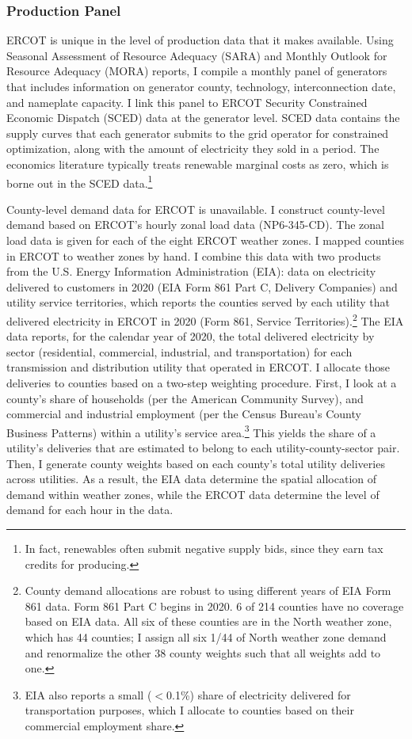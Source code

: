 \documentclass[12pt]{article}
\begin{document}
\subsubsection{Production Panel}
\label{sec:production}
ERCOT is unique in the level of production data that it makes available.  Using Seasonal Assessment of Resource Adequacy (SARA) and Monthly Outlook for Resource Adequacy (MORA) reports, I compile a monthly panel of generators that includes information on generator county, technology, interconnection date, and nameplate capacity. I link this panel to ERCOT Security Constrained Economic Dispatch (SCED) data at the generator level. SCED data contains the supply curves that each generator submits to the grid operator for constrained optimization, along with the amount of electricity they sold in a period. The economics literature typically treats renewable marginal costs as zero, which is borne out in the SCED data.\footnote{In fact, renewables often submit negative supply bids, since they earn tax credits for producing.} 



County-level demand data for ERCOT is unavailable. I construct county-level demand based on ERCOT's hourly zonal load data (NP6-345-CD). The zonal load data is given for each of the eight ERCOT weather zones. I mapped counties in ERCOT to weather zones by hand. I combine this data with two products from the U.S. Energy Information Administration (EIA): data on electricity delivered to customers in 2020 (EIA Form 861 Part C, Delivery Companies) and utility service territories, which reports the counties served by each utility that delivered electricity in ERCOT in 2020 (Form 861, Service Territories).\footnote{County demand allocations are robust to using different years of EIA Form 861 data. Form 861 Part C begins in 2020. 6 of 214 counties have no coverage based on EIA data. All six of these counties are in the North weather zone, which has 44 counties; I assign all six 1/44 of North weather zone demand and renormalize the other 38 county weights such that all weights add to one.} The EIA data reports, for the calendar year of 2020, the total delivered electricity by sector (residential, commercial, industrial, and transportation) for each transmission and distribution utility that operated in ERCOT. I allocate those deliveries to counties based on a two-step weighting procedure. First, I look at a county's share of households (per the American Community Survey), and commercial and industrial employment (per the Census Bureau's County Business Patterns) within a utility's service area.\footnote{EIA also reports a small ($<$0.1\%) share of electricity delivered for transportation purposes, which I allocate to counties based on their commercial employment share.} This yields the share of a utility's deliveries that are estimated to belong to each utility-county-sector pair. Then, I generate county weights based on each county's total utility deliveries across utilities. As a result, the EIA data determine the spatial allocation of demand within weather zones, while the ERCOT data determine the level of demand for each hour in the data. 
\end{document}

